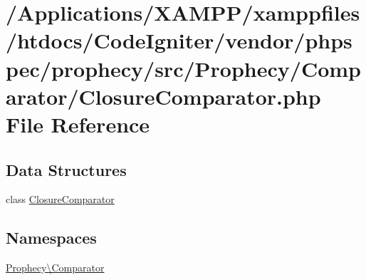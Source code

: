 \hypertarget{_closure_comparator_8php}{}\section{/\+Applications/\+X\+A\+M\+P\+P/xamppfiles/htdocs/\+Code\+Igniter/vendor/phpspec/prophecy/src/\+Prophecy/\+Comparator/\+Closure\+Comparator.php File Reference}
\label{_closure_comparator_8php}
\subsection*{Data Structures}
\begin{DoxyCompactItemize}
\item 
class \mbox{\hyperlink{class_prophecy_1_1_comparator_1_1_closure_comparator}{Closure\+Comparator}}
\end{DoxyCompactItemize}
\subsection*{Namespaces}
\begin{DoxyCompactItemize}
\item 
 \mbox{\hyperlink{namespace_prophecy_1_1_comparator}{Prophecy\textbackslash{}\+Comparator}}
\end{DoxyCompactItemize}
